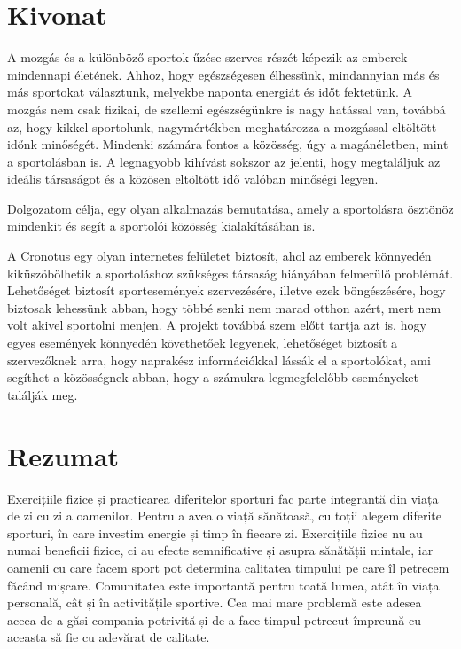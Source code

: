 
\hungarianParagraph


\chapter*{Kivonat}
A mozgás és a különböző sportok űzése szerves részét képezik az emberek mindennapi
  életének. Ahhoz, hogy egészségesen élhessünk, mindannyian más és más sportokat választunk,
  melyekbe naponta energiát és időt fektetünk. A mozgás nem csak fizikai, de szellemi
  egészségünkre is nagy hatással van, továbbá az, hogy kikkel sportolunk, nagymértékben
  meghatározza a mozgással eltöltött időnk minőségét\cite{warner2017yielding}. Mindenki számára fontos a közösség, úgy a
  magánéletben, mint a sportolásban is. A legnagyobb kihívást sokszor az jelenti, hogy
  megtaláljuk az ideális társaságot és a közösen eltöltött idő valóban minőségi legyen.
  
  Dolgozatom célja, egy olyan alkalmazás bemutatása, amely a sportolásra ösztönöz
  mindenkit és segít a sportolói közösség kialakításában is.
  
  A Cronotus egy olyan internetes felületet biztosít, ahol az emberek könnyedén
  kiküszöbölhetik a sportoláshoz szükséges társaság hiányában felmerülő problémát. Lehetőséget
  biztosít sportesemények szervezésére, illetve ezek böngészésére, hogy biztosak lehessünk abban,
  hogy többé senki nem marad otthon azért, mert nem volt akivel sportolni menjen. A projekt
  továbbá szem előtt tartja azt is, hogy egyes események könnyedén követhetőek legyenek,
  lehetőséget biztosít a szervezőknek arra, hogy naprakész információkkal lássák el a sportolókat,
  ami segíthet a közösségnek abban, hogy
  a számukra legmegfelelőbb eseményeket találják meg.



\vfill
{}

\chapter*{Rezumat}
Exercițiile fizice și practicarea diferitelor sporturi fac parte integrantă din viața de zi cu zi a oamenilor.
  Pentru a avea o viață sănătoasă, cu toții alegem diferite sporturi,
  în care investim energie și timp în fiecare zi. Exercițiile fizice nu au numai beneficii fizice, ci au efecte semnificative și asupra sănătății mintale,
  iar oamenii cu care facem sport pot determina calitatea timpului pe care îl petrecem făcând mișcare.\cite{warner2017yielding} Comunitatea este importantă
  pentru toată lumea, atât în viața personală, cât și în activitățile sportive. Cea mai mare problemă este adesea aceea de a găsi compania potrivită și de a face timpul petrecut împreună cu aceasta să fie cu adevărat de calitate.
  
